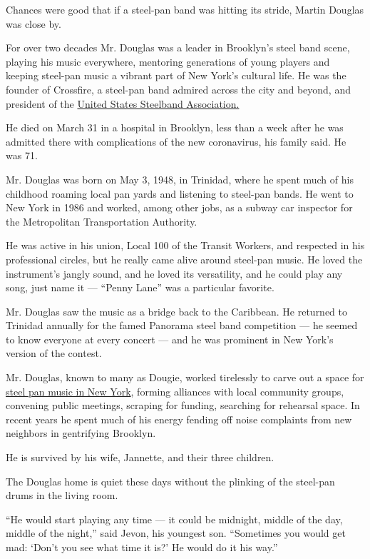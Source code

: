 Chances were good that if a steel-pan band was hitting its stride,
Martin Douglas was close by.

For over two decades Mr. Douglas was a leader in Brooklyn's steel band
scene, playing his music everywhere, mentoring generations of young
players and keeping steel-pan music a vibrant part of New York's
cultural life. He was the founder of Crossfire, a steel-pan band admired
across the city and beyond, and president of the
\href{https://www.panonthenet.com/news/2010/jan/ussa-new-begining-1-17-10.htm}{United
States Steelband Association.}

He died on March 31 in a hospital in Brooklyn, less than a week after he
was admitted there with complications of the new coronavirus, his family
said. He was 71.

Mr. Douglas was born on May 3, 1948, in Trinidad, where he spent much of
his childhood roaming local pan yards and listening to steel-pan bands.
He went to New York in 1986 and worked, among other jobs, as a subway
car inspector for the Metropolitan Transportation Authority.

He was active in his union, Local 100 of the Transit Workers, and
respected in his professional circles, but he really came alive around
steel-pan music. He loved the instrument's jangly sound, and he loved
its versatility, and he could play any song, just name it --- ``Penny
Lane'' was a particular favorite.

Mr. Douglas saw the music as a bridge back to the Caribbean. He returned
to Trinidad annually for the famed Panorama steel band competition ---
he seemed to know everyone at every concert --- and he was prominent in
New York's version of the contest.

Mr. Douglas, known to many as Dougie, worked tirelessly to carve out a
space for
\href{https://www.nytimes.com/2015/07/08/arts/music/steel-pan-bands-in-brooklyn-struggle-to-find-rehearsal-space.html}{steel
pan music in New York}, forming alliances with local community groups,
convening public meetings, scraping for funding, searching for rehearsal
space. In recent years he spent much of his energy fending off noise
complaints from new neighbors in gentrifying Brooklyn.

He is survived by his wife, Jannette, and their three children.

The Douglas home is quiet these days without the plinking of the
steel-pan drums in the living room.

``He would start playing any time --- it could be midnight, middle of
the day, middle of the night,'' said Jevon, his youngest son.
``Sometimes you would get mad: `Don't you see what time it is?' He would
do it his way.''

